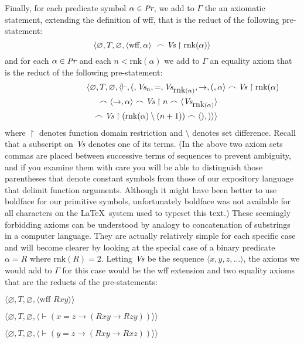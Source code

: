 Finally, for each predicate symbol $\alpha\in \mbox{\em Pr}$, we add to
$\Gamma$ the an axiomatic statement, extending the definition of wff,
that is the reduct of the following pre-statement:
\begin{displaymath}
    \langle\varnothing,T,\varnothing,
            \langle \mbox{wff},\alpha\rangle\
            \frown \mbox{\em Vs}\restriction\mbox{rnk}(\alpha)\rangle
\end{displaymath}
and for each $\alpha\in \mbox{\em Pr}$ and each $n < \mbox{rnk}(\alpha)$
we add to $\Gamma$ an equality axiom that is the reduct of the
following pre-statement:
\begin{eqnarray*}
    \lefteqn{\langle\varnothing,T,\varnothing,
            \langle
      \vdash,(,\mbox{\em Vs}_n,=,\mbox{\em Vs}_{\mbox{rnk}(\alpha)},\to,
            (,\alpha\rangle\frown \mbox{\em Vs}\restriction\mbox{rnk}(\alpha)} \\
  & & \frown
            \langle\to,\alpha\rangle\frown \mbox{\em Vs}\restriction n\frown
            \langle \mbox{\em Vs}_{\mbox{rnk}(\alpha)}\rangle \\
 & & \frown
            \mbox{\em Vs}\restriction(\mbox{rnk}(\alpha)\setminus(n+1))\frown
            \langle),)\rangle\rangle
\end{eqnarray*}
where $\restriction$ denotes function domain restriction and $\setminus$
denotes set difference.  Recall that a subscript on $\mbox{\em Vs}$
denotes one of its terms.  (In the above two axiom sets commas are placed
between successive terms of sequences to prevent ambiguity, and if you examine
them with care you will be able to distinguish those parentheses that denote
constant symbols from those of our expository language that delimit function
arguments.  Although it might have been better to use boldface for our
primitive symbols, unfortunately boldface was not available for all characters
on the \LaTeX\ system used to typeset this text.)  These seemingly forbidding
axioms can be understood by analogy to concatenation of substrings in a
computer language.  They are actually relatively simple for each specific case
and will become clearer by looking at the special case of a binary predicate
$\alpha = R$ where $\mbox{rnk}(R)=2$.  Letting $\mbox{\em Vs}$ be the sequence
$\langle x,y,z,\ldots\rangle$, the axioms we would add to $\Gamma$ for this
case would be the wff extension and two equality axioms that are the
reducts of the pre-statements:
\begin{list}{}{\itemsep 0.0pt}
      \item[] $\langle\varnothing,T,\varnothing,
               \langle \mbox{wff\ }R x y\rangle\rangle$
      \item[] $\langle\varnothing,T,\varnothing,
               \langle \vdash(x=z
                  \to(R x y \to R z y))
               \rangle\rangle$
      \item[] $\langle\varnothing,T,\varnothing,
               \langle \vdash(y=z
                  \to(R x y \to R x z))
               \rangle\rangle$
\end{list}
